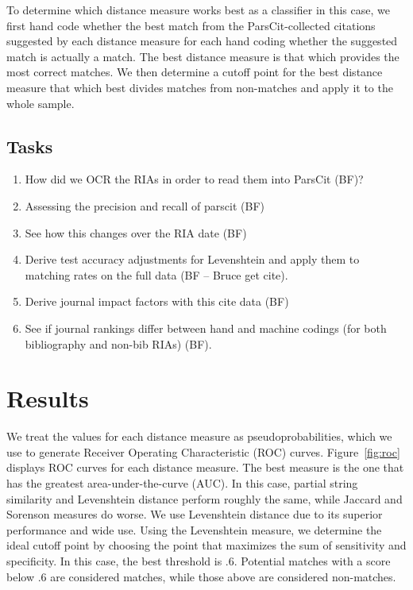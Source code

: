 \documentclass[12pt]{article}
\begin{document}
To determine which distance measure works best as a classifier in this case, we first hand code whether the best match from the ParsCit-collected citations suggested by each distance measure for each hand coding whether the suggested match is actually a match. The best distance measure is that which provides the most correct matches. We then determine a cutoff point for the best distance measure that which best divides matches from non-matches and apply it to the whole sample.\\

\subsection{Tasks}

\begin{enumerate}
\item How did we OCR the RIAs in order to read them into ParsCit (BF)?
\item Assessing the precision and recall of parscit (BF)
\item See how this changes over the RIA date (BF)
\item Derive test accuracy adjustments for Levenshtein and apply them to matching rates on the full data (BF -- Bruce get cite).
\item Derive journal impact factors with this cite data (BF)
\item See if journal rankings differ between hand and machine codings (for both bibliography and non-bib RIAs) (BF). 
\end{enumerate}



\section{Results}
We treat the values for each distance measure as pseudoprobabilities, which we use to generate Receiver Operating Characteristic (ROC) curves. Figure~\ref{fig:roc} displays ROC curves for each distance measure. The best measure is the one that has the greatest area-under-the-curve (AUC). In this case, partial string similarity and Levenshtein distance perform roughly the same, while Jaccard and Sorenson measures do worse. We use Levenshtein distance due to its superior performance and wide use. Using the Levenshtein measure, we determine the ideal cutoff point by choosing the point that maximizes the sum of sensitivity and specificity. In this case, the best threshold is .6. Potential matches with a score below .6 are considered matches, while those above are considered non-matches.
\end{document}
